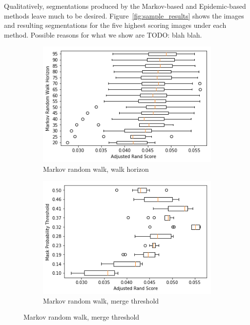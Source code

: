\documentclass[twocolumn]{article}
\newcommand{\todo}[1]{}
\renewcommand{\todo}[1]{{\color{red} TODO: {#1}}}
\newcommand{\figref}[1]{Figure~\ref{fig:#1}}
\begin{document}
Qualitatively, segmentations produced by the Markov-based and Epidemic-based
methods leave much to be desired. \figref{sample_results} shows the images and
resulting segmentations for the five highest scoring images under each method.
Possible reasons for what we show are \todo{blah blah}.

\begin{figure}[t!]
  \centering

  \begin{subfigure}{0.49\linewidth}
    \includegraphics[width=\linewidth]{figs/markov_horizon.png}
    \caption{Markov random walk, walk horizon}
  \end{subfigure}
  \begin{subfigure}{0.49\linewidth}
    \includegraphics[width=\linewidth]{figs/markov_thresh.png}
    \caption{Markov random walk, merge threshold}
  \end{subfigure}


\end{figure}
\end{document}
